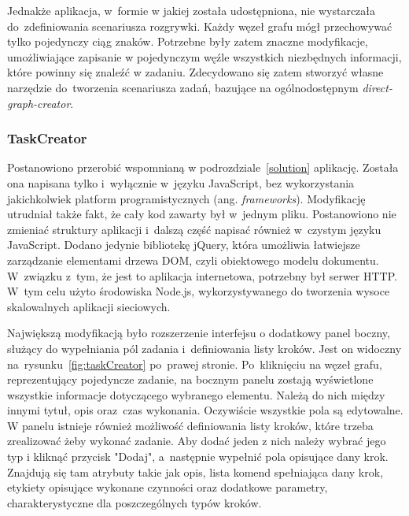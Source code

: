 \documentclass[12pt,a4paper,polish,thesis]{dcsbook}
\begin{document}
{	Jednakże aplikacja, w~formie w jakiej została udostępniona, nie wystarczała do~zdefiniowania scenariusza rozgrywki. Każdy węzeł grafu mógł przechowywać tylko pojedynczy ciąg znaków. Potrzebne były zatem znaczne modyfikacje, umożliwiające zapisanie w pojedynczym węźle wszystkich niezbędnych informacji, które powinny się znaleźć w zadaniu. Zdecydowano się zatem stworzyć własne narzędzie do~tworzenia scenariusza zadań, bazujące na ogólnodostępnym \textit{direct-graph-creator}.

	\subsubsection{TaskCreator}

	Postanowiono przerobić wspomnianą w podrozdziale~\ref{solution} aplikację. Została ona napisana tylko i~wyłącznie w~języku JavaScript, bez wykorzystania jakichkolwiek platform programistycznych (ang. \textit{frameworks}). Modyfikację utrudniał także fakt, że cały kod zawarty był w~jednym pliku. Postanowiono nie zmieniać struktury aplikacji i~dalszą część napisać również w~czystym języku JavaScript. Dodano jedynie bibliotekę jQuery, która umożliwia łatwiejsze zarządzanie elementami drzewa DOM, czyli obiektowego modelu dokumentu. W~związku z~tym, że jest to aplikacja internetowa, potrzebny był serwer HTTP. W~tym celu użyto środowiska Node.js, wykorzystywanego do tworzenia wysoce skalowalnych aplikacji sieciowych.

	Największą modyfikacją było rozszerzenie interfejsu o dodatkowy panel boczny, służący do wypełniania pól zadania i~definiowania listy kroków. Jest on widoczny na~rysunku~\ref{fig:taskCreator} po~prawej stronie. Po~kliknięciu na węzeł grafu, reprezentujący pojedyncze zadanie, na bocznym panelu zostają wyświetlone wszystkie informacje dotyczącego wybranego elementu. Należą do nich między innymi tytuł, opis oraz~czas wykonania. Oczywiście wszystkie pola są edytowalne. W panelu istnieje również możliwość definiowania listy kroków, które trzeba zrealizować żeby wykonać zadanie. Aby dodać jeden z nich należy wybrać jego typ i kliknąć przycisk "Dodaj", a~następnie wypełnić pola opisujące dany krok. Znajdują się tam atrybuty takie jak opis, lista komend spełniająca dany krok, etykiety opisujące wykonane czynności oraz dodatkowe parametry, charakterystyczne dla poszczególnych typów kroków.
	
}
\end{document}
